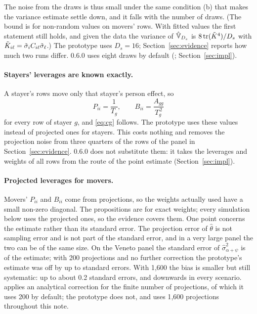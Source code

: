 The noise from the draws is thus small under the same condition (b) that makes the variance estimate settle
down, and it falls with the number of draws. (The bound is for non-random values on movers' rows. With fitted
values the first statement still holds, and given the data the variance of $\hat{\mathbb{V}}_{D_s}$ is
$8\operatorname{tr}(\tilde K^4)/D_s$ with $\tilde K_{i\ell}=\tilde\sigma_iC_{i\ell}\tilde\sigma_\ell$.) The prototype uses $D_s=16$;
Section~\ref{sec:evidence} reports how much two runs differ. \fevc{} 0.6.0 uses eight draws by default
(; Section~\ref{sec:impl}).

\paragraph{Stayers' leverages are known exactly.} A stayer's rows move only that stayer's person effect, so
\[
P_{ii}=\frac{1}{T_g},\qquad B_{ii}=\frac{A_{gg}}{T_g^{\,2}}
\]
for every row of stayer $g$, and \eqref{eq:cg} follows. The prototype uses these values instead of projected
ones for stayers. This costs nothing and removes the projection noise from three quarters of the rows of the
panel in Section~\ref{sec:evidence}. \fevc{} 0.6.0 does not substitute them: it takes the leverages and weights of
all rows from the route of the point estimate (Section~\ref{sec:impl}).

\paragraph{Projected leverages for movers.} Movers' $P_{ii}$ and $B_{ii}$ come from projections, so the weights
actually used have a small non-zero diagonal. The propositions are for exact weights; every simulation below
uses the projected ones, so the evidence covers them. One point concerns the estimate rather than its standard
error. The projection error of $\hat\theta$ is not sampling error and is not part of the standard error, and in a
very large panel the two can be of the same size. On the Veneto panel the standard error of
$\hat\sigma^2_{\alpha+\psi}$ is  of the estimate; with 200 projections and no further
correction the prototype's estimate was off by up to  standard errors. With 1{,}600 the bias is
smaller but still systematic: up to about 0.2 standard errors, and downwards in every scenario. \fevc{} applies an analytical correction for the finite number of projections, of which it uses 200 by default; the prototype
does not, and uses 1{,}600 projections throughout this note.

